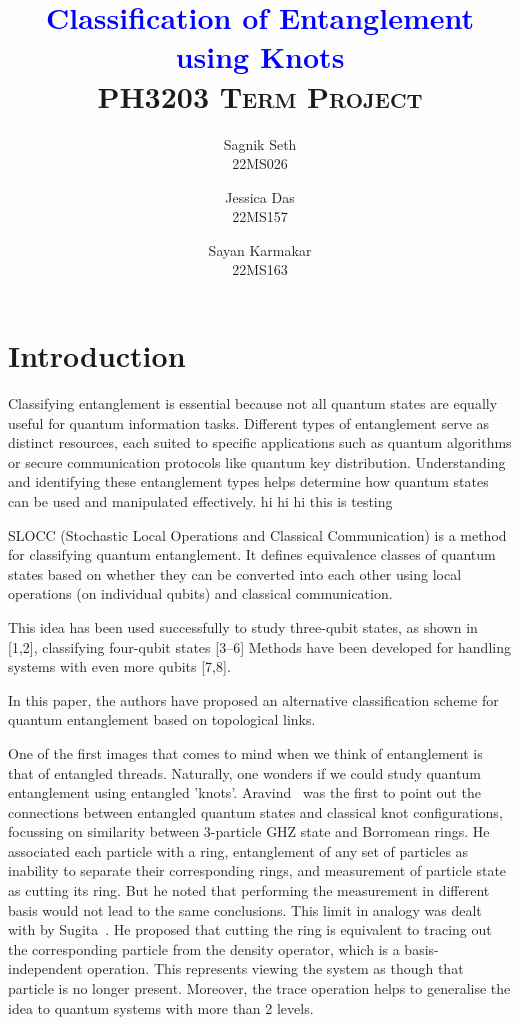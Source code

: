 \documentclass{scrartcl}
\title{
        \Huge\textbf{\textcolor{blue}{{Classification of Entanglement using Knots}}} \\[0.5cm]
        \Large\textsc{{PH3203 Term Project} }
}
\author{{\Large Sagnik Seth} \\ \small{22MS026} \and {\Large Jessica  Das} \\ \small{22MS157} \and {\Large Sayan Karmakar} \\ \small{22MS163}}
\date{}
\begin{document}
\maketitle  
\tableofcontents
\newpage
\section{Introduction}

Classifying entanglement is essential because not all quantum states are equally useful for quantum information tasks. Different types of entanglement serve as distinct resources, each suited to specific applications such as quantum algorithms or secure communication protocols like quantum key distribution. Understanding and identifying these entanglement types helps determine how quantum states can be used and manipulated effectively. hi hi hi this is testing


SLOCC (Stochastic Local Operations and Classical Communication) is a method for classifying quantum entanglement. It defines equivalence classes of quantum states based on whether they can be converted into each other using local operations (on individual qubits) and classical communication. 

This idea has been used successfully to study three-qubit states, as shown in [1,2], classifying four-qubit states [3–6] Methods have been developed for handling systems with even more qubits [7,8].

In this paper, the authors have proposed an alternative classification scheme for quantum entanglement based on topological links.


One of the first images that comes to mind when we think of entanglement is that of entangled threads. Naturally, one wonders if we could study quantum entanglement using entangled 'knots'. Aravind~\cite{Aravind} was the first to point out the connections between entangled quantum states and classical knot configurations, focussing on similarity between 3-particle GHZ state and Borromean rings. He associated each particle with a ring, entanglement of any set of particles as inability to separate their corresponding rings, and measurement of particle state as cutting its ring. But he noted that performing the measurement in different basis would not lead to the same conclusions. This limit in analogy was dealt with by Sugita~\cite{Sugita}. He proposed that cutting the ring is equivalent to tracing out the corresponding particle from the density operator, which is a basis-independent operation. This represents viewing the system as though that particle is no longer present. Moreover, the trace operation helps to generalise the idea to quantum systems with more than 2 levels.  
\end{document}
